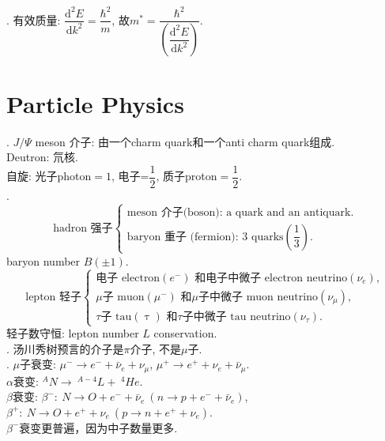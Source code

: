 \documentclass[12pt, 
]{article}
\begin{document}
. 有效质量: $\dfrac{\mathrm{d}^2E}{\mathrm{d}k^2}=\dfrac{\hbar^2}{m}$, 故$m^*=\dfrac{\hbar^2}{\left(\dfrac{\mathrm{d}^2E}{\mathrm{d}k^2}\right)}$.

\newpage

\section{Particle Physics}
. $J/\varPsi$ meson 介子: 由一个charm quark和一个anti charm quark组成.
~\\\phantom{~~~~}Deutron: 氘核.
~\\\phantom{~~~~}自旋: 光子photon$=1$, 电子=$\dfrac{1}{2}$, 质子proton$=\dfrac{1}{2}$.
~\\

. \[
	\text{hadron 强子}\left\{
	\begin{array}{l}
		\text{meson 介子(boson): a quark and an antiquark}.\\
		\text{baryon 重子 (fermion): 3 quarks}(\dfrac{1}{3}).
	\end{array}
	\right.
\]
\phantom{~~~~~~~~~~~~~~~~~~~~~~~~~~~~~~~~~~~~~~~~}baryon number $B(\pm1)$.
 \[
	\text{lepton 轻子}\left\{
	\begin{array}{l}
		\text{电子 electron} (e^-) \text{ 和电子中微子 electron neutrino} (\nu_e),\\
		\mu\text{子 muon} (\mu^-) \text{ 和}\mu\text{子中微子 muon neutrino} (\nu_\mu),\\
		\tau\text{子 tau} (\uptau) \text{ 和}\tau\text{子中微子 tau neutrino} (\nu_\tau).
	\end{array}
	\right.
\]
轻子数守恒: lepton number $L$ conservation.
~\\

. 汤川秀树预言的介子是$\pi$介子, 不是$\mu$子.
~\\

. $\mu$子衰变: $\mu^-\rightarrow e^-+\bar{\nu}_e+\nu_\mu$, $\mu^+\rightarrow e^++\nu_e+\bar{\nu}_\mu$.
~\\\phantom{~~~~}$\alpha$衰变: $^AN\rightarrow~^{A-4}L+~^4He$.
~\\\phantom{~~~~}$\beta$衰变: $\beta^-:~N\rightarrow O+e^-+\bar{\nu}_e~(n\rightarrow p+e^-+\bar{\nu}_e)$,
~\\\phantom{~~~~ib衰变:~}$\beta^+:~N\rightarrow O+e^++\nu_e~(p\rightarrow n+e^++\nu_e)$.
~\\\phantom{~~~~}$\beta^-$衰变更普遍，因为中子数量更多.
\end{document}
